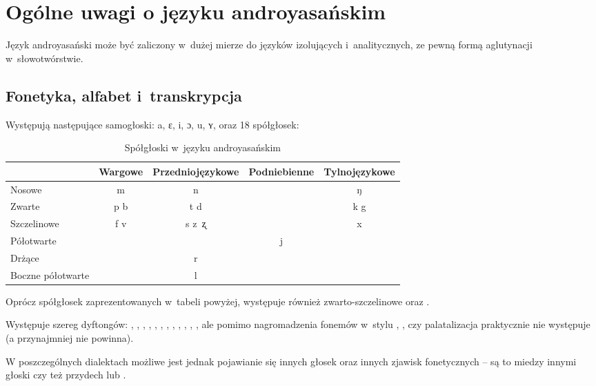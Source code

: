 \section[Ogólne uwagi]{Ogólne uwagi o języku androyasańskim}

\begin{spacing}{1.1}
Język androyasański może być zaliczony w~dużej mierze do języków 
izolujących i~analitycznych, ze pewną formą aglutynacji w~słowotwórstwie.

\subsection{Fonetyka, alfabet i~transkrypcja}

Występują następujące samogłoski: a, ɛ, i, ɔ, u, ʏ, oraz 18 spółgłosek:

\begin{table}[ht]
\centering
\caption{Spółgłoski w~języku androyasańskim}
\begin{tabular}{lcccc}\toprule
                  & Wargowe & Przedniojęzykowe & Podniebienne & Tylnojęzykowe \\\midrule
Nosowe            & m       & n                &              & ŋ             \\\midrule
Zwarte            & p b     & t d              &              & k g           \\\midrule
Szczelinowe       & f v     & s z~ʐ            &              & x             \\\midrule
Półotwarte        &         &                  & j            &               \\\midrule
Drżące            &         & r                &              &               \\\midrule
Boczne półotwarte &         & l                &              &               \\\bottomrule
\end{tabular}
\label{tab:consonants}
\end{table}

Oprócz spółgłosek zaprezentowanych w~tabeli powyżej, występuje 
również zwarto-szczelinowe  oraz .

Występuje szereg dyftongów: , , , , ,
, , , , , , , ale pomimo
nagromadzenia fonemów w~stylu , , czy  palatalizacja
praktycznie nie występuje (a przynajmniej nie powinna).

W poszczególnych dialektach możliwe jest jednak pojawianie się innych głosek
oraz innych zjawisk fonetycznych -- są to miedzy innymi głoski  czy też
przydech  lub .


\end{spacing}

